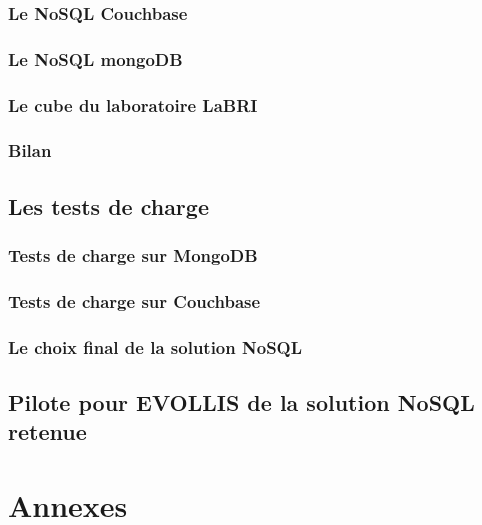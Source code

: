                 \section{Le \textsf{NoSQL Couchbase}}\label{couchbase}
                

                \section{Le \textsf{NoSQL mongoDB}}\label{mongodb}
                

                \section{Le \textsf{cube} du laboratoire \textsf{LaBRI}}\label{cube}
                

                \section{Bilan}
                

      \chapter{Les tests de charge}

                \section{Tests de charge sur \textsf{MongoDB}}

                \section{Tests de charge sur \textsf{Couchbase}}
     
                \section{Le choix final de la solution \textsf{NoSQL}}

      \chapter{Pilote pour \textsf{EVOLLIS} de la solution \textsf{NoSQL} retenue}

      

\printindex

\nocite{cassandra2}
\nocite{cassandra}
\nocite{NoSQLCmp}
\nocite{NoSQLeurope}
\nocite{NoSQLvsSQL}



\part{Annexes}
\appendix





